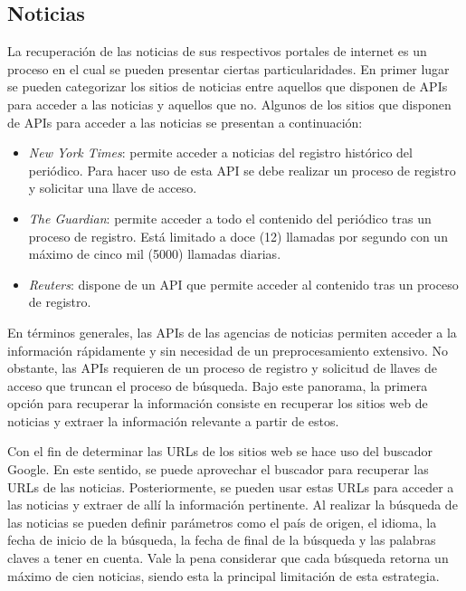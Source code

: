\subsection{Noticias}
La recuperación de las noticias de sus respectivos portales de internet es un proceso en el cual se pueden presentar ciertas particularidades. En primer lugar se pueden categorizar los sitios de noticias entre aquellos que disponen de APIs para acceder a las noticias y aquellos que no. Algunos de los sitios que disponen de APIs para acceder a las noticias se presentan a continuación:

\begin{itemize}
    \item \textit{New York Times}: permite acceder a noticias del registro histórico del periódico. Para hacer uso de esta API se debe realizar un proceso de registro y solicitar una llave de acceso.
    
    \item \textit{The Guardian}: permite acceder a todo el contenido del periódico tras un proceso de registro. Está limitado a doce (12) llamadas por segundo con un máximo de cinco mil (5000) llamadas diarias.
    
    \item \textit{Reuters}: dispone de un API que permite acceder al contenido tras un proceso de registro.
\end{itemize}

En términos generales, las APIs de las agencias de noticias permiten acceder a la información rápidamente y sin necesidad de un preprocesamiento extensivo. No obstante, las APIs requieren de un proceso de registro y solicitud de llaves de acceso que truncan el proceso de búsqueda. Bajo este panorama, la primera opción para recuperar la información consiste en recuperar los sitios web de noticias y extraer la información relevante a partir de estos. 

Con el fin de determinar las URLs de los sitios web se hace uso del buscador Google. En este sentido, se puede aprovechar el buscador para recuperar las URLs de las noticias. Posteriormente, se pueden usar estas URLs para acceder a las noticias y extraer de allí la información pertinente. Al realizar la búsqueda de las noticias se pueden definir parámetros como el país de origen, el idioma, la fecha de inicio de la búsqueda, la fecha de final de la búsqueda y las palabras claves a tener en cuenta. Vale la pena considerar que cada búsqueda retorna un máximo de cien noticias, siendo esta la principal limitación de esta estrategia.